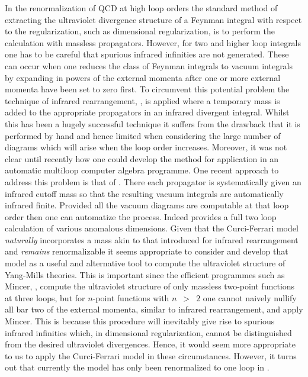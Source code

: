 \documentclass[a4paper,11pt]{article}
\begin{document}
In the renormalization of QCD at high loop orders the standard method of
extracting the ultraviolet divergence structure of a Feynman integral with
respect to the regularization, such as dimensional regularization, is to 
perform the calculation with massless propagators. However, for two and higher 
loop integrals one has to be careful that spurious infrared infinities are not
generated. These can occur when one reduces the class of Feynman integrals to 
vacuum integrals by expanding in powers of the external momenta after one or
more external momenta have been set to zero first. To circumvent this potential 
problem the technique of infrared rearrangement, \cite{15,16}, is applied where
a temporary mass is added to the appropriate propagators in an infrared 
divergent integral. Whilst this has been a hugely successful technique it 
suffers from the drawback that it is performed by hand and hence limited when 
considering the large number of diagrams which will arise when the loop order 
increases. Moreover, it was not clear until recently how one could develop the 
method for application in an automatic multiloop computer algebra programme. 
One recent approach to address this problem is that of \cite{17,18}. There each
propagator is systematically given an infrared cutoff mass so that the 
resulting vacuum integrals are automatically infrared finite. Provided all the 
vacuum diagrams are computable at that loop order then one can automatize the 
process. Indeed \cite{17,18} provides a full two loop calculation of various 
anomalous dimensions. Given that the Curci-Ferrari model {\em naturally} 
incorporates a mass akin to that introduced for infrared rearrangement and 
{\em remains} renormalizable it seems appropriate to consider and develop that 
model as a useful and alternative tool to compute the ultraviolet structure of 
Yang-Mills theories. This is important since the efficient programmes such as 
{\sc Mincer}, \cite{19}, compute the ultraviolet structure of only massless 
two-point functions at three loops, but for $n$-point functions with 
$n$~$>$~$2$ one cannot naively nullify all bar two of the external momenta, 
similar to infrared rearrangement, and apply {\sc Mincer}. This is because this
procedure will inevitably give rise to spurious infrared infinities which, in 
dimensional regularization, cannot be distinguished from the desired 
ultraviolet divergences. Hence, it would seem more appropriate to us to apply 
the Curci-Ferrari model in these circumstances. However, it turns out that 
currently the model has only been renormalized to one loop in \cite{4}. 
\end{document}
